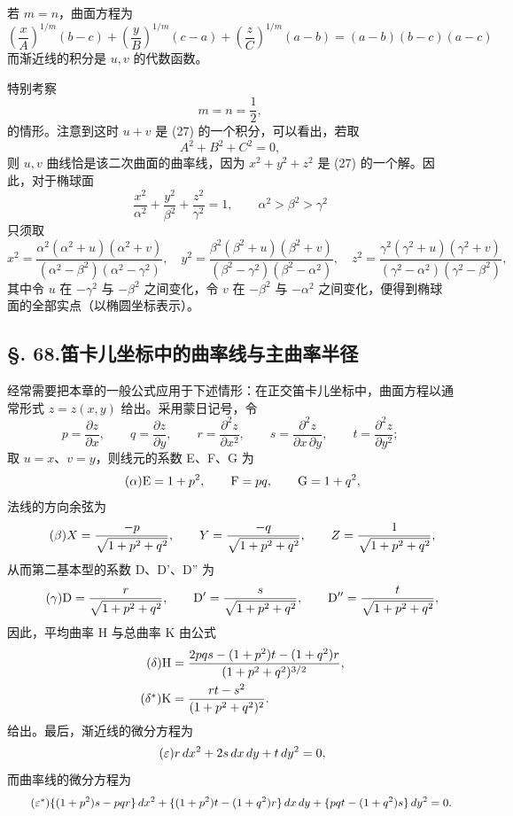 若 \(m=n\)，曲面方程为
\[
\left(\frac{x}{A}\right)^{\!1/m}(b-c)+\left(\frac{y}{B}\right)^{\!1/m}(c-a)+\left(\frac{z}{C}\right)^{\!1/m}(a-b)=(a-b)(b-c)(a-c)
\]
而渐近线的积分是 \(u,v\) 的代数函数。

特别考察
\[
m=n=\frac12,
\]
的情形。注意到这时 \(u+v\) 是 (27) 的一个积分，可以看出，若取
\[
A^2+B^2+C^2=0,
\]
则 \(u,v\) 曲线恰是该二次曲面的曲率线，因为 \(x^2+y^2+z^2\) 是 (27) 的一个解。因此，对于椭球面
\[
\frac{x^2}{\alpha^2}+\frac{y^2}{\beta^2}+\frac{z^2}{\gamma^2}=1, \qquad \alpha^2>\beta^2>\gamma^2
\]
只须取
\[
x^2=\frac{\alpha^2(\alpha^2+u)(\alpha^2+v)}{(\alpha^2-\beta^2)(\alpha^2-\gamma^2)},\quad
y^2=\frac{\beta^2(\beta^2+u)(\beta^2+v)}{(\beta^2-\gamma^2)(\beta^2-\alpha^2)},\quad
z^2=\frac{\gamma^2(\gamma^2+u)(\gamma^2+v)}{(\gamma^2-\alpha^2)(\gamma^2-\beta^2)},
\]
其中令 \(u\) 在 \(-\gamma^2\) 与 \(-\beta^2\) 之间变化，令 \(v\) 在 \(-\beta^2\) 与 \(-\alpha^2\) 之间变化，便得到椭球面的全部实点（以椭圆坐标表示）。

\subsection*{§. 68.\quad 笛卡儿坐标中的曲率线与主曲率半径}

经常需要把本章的一般公式应用于下述情形：在正交笛卡儿坐标中，曲面方程以通常形式 \(z=z(x,y)\) 给出。采用蒙日记号，令
\[
p=\frac{\partial z}{\partial x}, \qquad q=\frac{\partial z}{\partial y}, \qquad r=\frac{\partial^2 z}{\partial x^2}, \qquad s=\frac{\partial^2 z}{\partial x\,\partial y}, \qquad t=\frac{\partial^2 z}{\partial y^2};
\]
取 \(u=x\)、\(v=y\)，则线元的系数 E、F、G 为
\begin{equation}\tag{\ensuremath{\alpha}}
\mathrm{E}=1+p^2, \qquad \mathrm{F}=pq, \qquad \mathrm{G}=1+q^2,
\end{equation}
法线的方向余弦为
\begin{equation}\tag{\ensuremath{\beta}}
X=\frac{-p}{\sqrt{1+p^2+q^2}}, \qquad Y=\frac{-q}{\sqrt{1+p^2+q^2}}, \qquad Z=\frac{1}{\sqrt{1+p^2+q^2}},
\end{equation}
从而第二基本型的系数 D、D'、D'' 为
\begin{equation}\tag{\ensuremath{\gamma}}
\mathrm{D}=\frac{r}{\sqrt{1+p^2+q^2}}, \qquad \mathrm{D'}=\frac{s}{\sqrt{1+p^2+q^2}}, \qquad \mathrm{D''}=\frac{t}{\sqrt{1+p^2+q^2}},
\end{equation}
因此，平均曲率 H 与总曲率 K 由公式
\begin{align}
\tag{\ensuremath{\delta}}
\mathrm{H}&=\frac{2pqs-(1+p^2)t-(1+q^2)r}{(1+p^2+q^2)^{3/2}},\\
\tag{\ensuremath{\delta^*}}
\mathrm{K}&=\frac{rt-s^2}{(1+p^2+q^2)^2}.
\end{align}
给出。最后，渐近线的微分方程为
\begin{equation}\tag{\ensuremath{\varepsilon}}
r\,dx^2+2s\,dx\,dy+t\,dy^2=0,
\end{equation}
而曲率线的微分方程为
\begin{equation}\tag{\ensuremath{\varepsilon^*}}
\{(1+p^2)s-pqr\}\,dx^2+\{(1+p^2)t-(1+q^2)r\}\,dx\,dy+\{pqt-(1+q^2)s\}\,dy^2=0.
\end{equation}

